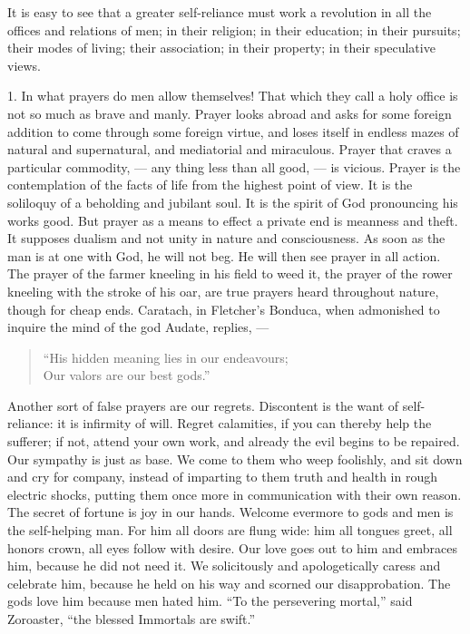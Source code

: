 \documentclass[12pt]{article}
\begin{document}
It is easy to see that a greater self-reliance must work a revolution in all
the offices and relations of men; in their religion; in their education; in
their pursuits; their modes of living; their association; in their property;
in their speculative views.

1. In what prayers do men allow themselves! That which they call a holy
office is not so much as brave and manly. Prayer looks abroad and asks for
some foreign addition to come through some foreign virtue, and loses itself
in endless mazes of natural and supernatural, and mediatorial and
miraculous. Prayer that craves a particular commodity, --- any thing less
than all good, --- is vicious. Prayer is the contemplation of the facts of
life from the highest point of view. It is the soliloquy of a beholding and
jubilant soul. It is the spirit of God pronouncing his works good. But
prayer as a means to effect a private end is meanness and theft. It supposes
dualism and not unity in nature and consciousness. As soon as the man is at
one with God, he will not beg. He will then see prayer in all action. The
prayer of the farmer kneeling in his field to weed it, the prayer of the
rower kneeling with the stroke of his oar, are true prayers heard throughout
nature, though for cheap ends. Caratach, in Fletcher's Bonduca, when
admonished to inquire the mind of the god Audate, replies, ---

\begin{verse}
``His hidden meaning lies in our endeavours;\\
Our valors are our best gods.''
\end{verse}

Another sort of false prayers are our regrets. Discontent is the want of
self-reliance: it is infirmity of will. Regret calamities, if you can
thereby help the sufferer; if not, attend your own work, and already the
evil begins to be repaired. Our sympathy is just as base. We come to them
who weep foolishly, and sit down and cry for company, instead of imparting
to them truth and health in rough electric shocks, putting them once more in
communication with their own reason. The secret of fortune is joy in our
hands. Welcome evermore to gods and men is the self-helping man. For him all
doors are flung wide: him all tongues greet, all honors crown, all eyes
follow with desire. Our love goes out to him and embraces him, because he
did not need it. We solicitously and apologetically caress and celebrate
him, because he held on his way and scorned our disapprobation. The gods
love him because men hated him. ``To the persevering mortal,'' said Zoroaster,
``the blessed Immortals are swift.''
\end{document}

